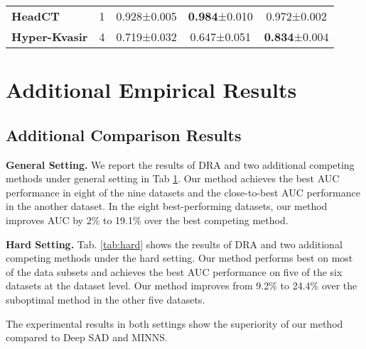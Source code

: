 \documentclass[10pt,twocolumn,letterpaper]{article}
\begin{document}
{\begin{table}[bt]
{\begin{tabular}{l@{}|c|ccc}
   \textbf{HeadCT}& 1 & 0.928\footnotesize{±0.005}& \textbf{0.984}\footnotesize{±0.010}& 0.972\footnotesize{±0.002}\\
   
   \textbf{Hyper-Kvasir}& 4 & 0.719\footnotesize{±0.032}& 0.647\footnotesize{±0.051}& \textbf{0.834}\footnotesize{±0.004} \\
   \hline
    \end{tabular}
    }
  \label{tab:randomanomalies}\vspace{-0.3cm}
\end{table}\section{Additional Empirical Results}
\subsection{Additional Comparison Results}
\noindent\textbf{General Setting.} We report the results of DRA and two additional competing methods under general setting in Tab \ref{tab:randomanomalies}. Our method achieves the best AUC performance in eight of the nine datasets and the close-to-best AUC performance in the another dataset. In the eight best-performing datasets, our method improves AUC by 2\% to 19.1\% over the best competing method.

\noindent\textbf{Hard Setting.} Tab. \ref{tab:hard} shows the results of DRA and two additional competing methods under the hard setting. Our method performs best on most of the data subsets and achieves the best AUC performance on five of the six datasets at the dataset level. 
Our method improves from 9.2\% to 24.4\% over the suboptimal method in the other five datasets.

The experimental results in both settings show the superiority of our method compared to Deep SAD and MINNS.



}
\end{document}

